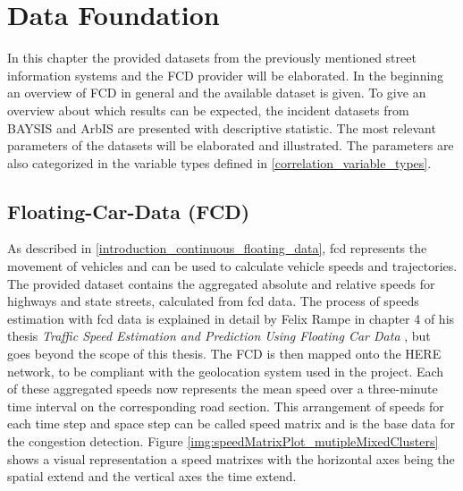 \chapter{Data Foundation}
\label{data}
In this chapter the provided datasets from the previously mentioned street information systems and the FCD provider will be elaborated. In the beginning an overview of FCD in general and the available dataset is given. To give an overview about which results can be expected, the incident datasets from BAYSIS and ArbIS are presented with descriptive statistic. The most relevant parameters of the datasets will be elaborated and illustrated. The parameters are also categorized in the variable types defined in \cref{correlation_variable_types}.

\section{Floating-Car-Data (FCD)}
\label{dataset_fcd}
As described in \cref{introduction_continuous_floating_data}, \acrshort{fcd} represents the movement of vehicles and can be used to calculate vehicle speeds and trajectories. The provided dataset contains the aggregated absolute and relative speeds for highways and state streets, calculated from \acrshort{fcd} data. The process of speeds estimation with \acrshort{fcd} data is explained in detail by Felix Rampe in chapter 4 of his thesis \textit{Traffic Speed Estimation and Prediction Using Floating Car Data} \parencite{Rempe2018}, but goes beyond the scope of this thesis. The FCD is then mapped onto the HERE \parencite{HERE2020} network, to be compliant with the geolocation system used in the project. Each of these aggregated speeds now represents the mean speed over a three-minute time interval on the corresponding road section. This arrangement of speeds for each time step and space step can be called speed matrix and is the base data for the congestion detection. Figure \ref{img:speedMatrixPlot_mutipleMixedClusters} shows a visual representation a speed matrixes with the horizontal axes being the spatial extend and the vertical axes the time extend.

